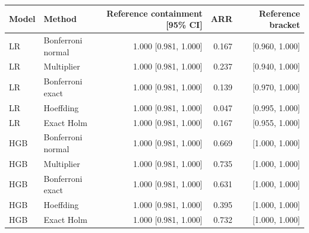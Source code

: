 \begin{tabular}{llrrr}
\toprule
Model & Method & Reference containment [95\% CI] & ARR & Reference bracket \\
\midrule
LR & Bonferroni normal & 1.000 [0.981, 1.000] & 0.167 & [0.960, 1.000] \\
LR & Multiplier & 1.000 [0.981, 1.000] & 0.237 & [0.940, 1.000] \\
LR & Bonferroni exact & 1.000 [0.981, 1.000] & 0.139 & [0.970, 1.000] \\
LR & Hoeffding & 1.000 [0.981, 1.000] & 0.047 & [0.995, 1.000] \\
LR & Exact Holm & 1.000 [0.981, 1.000] & 0.167 & [0.955, 1.000] \\
HGB & Bonferroni normal & 1.000 [0.981, 1.000] & 0.669 & [1.000, 1.000] \\
HGB & Multiplier & 1.000 [0.981, 1.000] & 0.735 & [1.000, 1.000] \\
HGB & Bonferroni exact & 1.000 [0.981, 1.000] & 0.631 & [1.000, 1.000] \\
HGB & Hoeffding & 1.000 [0.981, 1.000] & 0.395 & [1.000, 1.000] \\
HGB & Exact Holm & 1.000 [0.981, 1.000] & 0.732 & [1.000, 1.000] \\
\bottomrule
\end{tabular}
